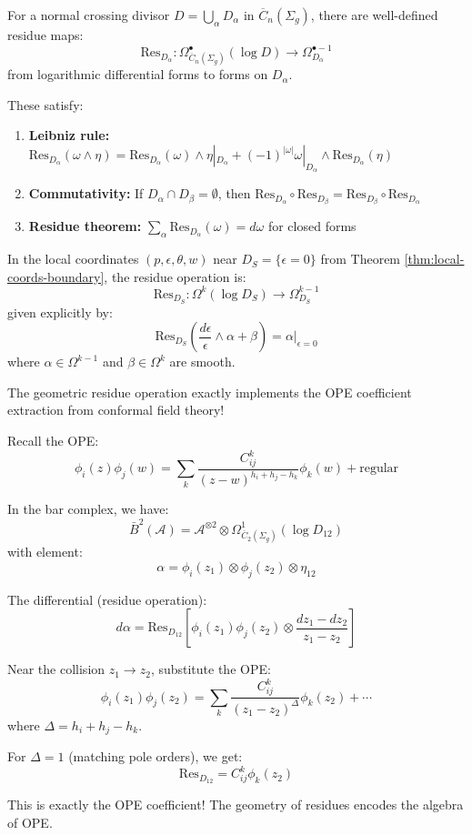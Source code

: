 \begin{theorem}\label{thm:residue-operations}
For a normal crossing divisor $D = \bigcup_\alpha D_\alpha$ in $\overline{C}_n(\Sigma_g)$, there are well-defined residue maps:
$$\text{Res}_{D_\alpha}: \Omega^{\bullet}_{\overline{C}_n(\Sigma_g)}(\log D) \to \Omega^{\bullet-1}_{D_\alpha}$$
from logarithmic differential forms to forms on $D_\alpha$.

These satisfy:
\begin{enumerate}
\item \textbf{Leibniz rule:} $\text{Res}_{D_\alpha}(\omega \wedge \eta) = \text{Res}_{D_\alpha}(\omega) \wedge \eta|_{D_\alpha} + (-1)^{|\omega|}\omega|_{D_\alpha} \wedge \text{Res}_{D_\alpha}(\eta)$
\item \textbf{Commutativity:} If $D_\alpha \cap D_\beta = \emptyset$, then $\text{Res}_{D_\alpha} \circ \text{Res}_{D_\beta} = \text{Res}_{D_\beta} \circ \text{Res}_{D_\alpha}$
\item \textbf{Residue theorem:} $\sum_\alpha \text{Res}_{D_\alpha}(\omega) = d\omega$ for closed forms
\end{enumerate}
\end{theorem}

\begin{proposition}\label{prop:residue-local}
In the local coordinates $(p, \epsilon, \theta, w)$ near $D_S = \{\epsilon = 0\}$ from Theorem \ref{thm:local-coords-boundary}, the residue operation is:
$$\text{Res}_{D_S}: \Omega^k(\log D_S) \to \Omega^{k-1}_{D_S}$$
given explicitly by:
$$\text{Res}_{D_S}\left(\frac{d\epsilon}{\epsilon} \wedge \alpha + \beta\right) = \alpha|_{\epsilon=0}$$
where $\alpha \in \Omega^{k-1}$ and $\beta \in \Omega^k$ are smooth.
\end{proposition}

\begin{remark}\label{rem:residues-and-ope}
The geometric residue operation exactly implements the OPE coefficient extraction from conformal field theory!

Recall the OPE:
$$\phi_i(z)\phi_j(w) = \sum_k \frac{C_{ij}^k}{(z-w)^{h_i+h_j-h_k}} \phi_k(w) + \text{regular}$$

In the bar complex, we have:
$$\bar{B}^2(\mathcal{A}) = \mathcal{A}^{\otimes 2} \otimes \Omega^1_{\overline{C}_2(\Sigma_g)}(\log D_{12})$$
with element:
$$\alpha = \phi_i(z_1) \otimes \phi_j(z_2) \otimes \eta_{12}$$

The differential (residue operation):
$$d\alpha = \text{Res}_{D_{12}}\left[\phi_i(z_1)\phi_j(z_2) \otimes \frac{dz_1 - dz_2}{z_1 - z_2}\right]$$

Near the collision $z_1 \to z_2$, substitute the OPE:
$$\phi_i(z_1)\phi_j(z_2) = \sum_k \frac{C_{ij}^k}{(z_1-z_2)^{\Delta}} \phi_k(z_2) + \cdots$$
where $\Delta = h_i + h_j - h_k$.

For $\Delta = 1$ (matching pole orders), we get:
$$\text{Res}_{D_{12}} = C_{ij}^k \phi_k(z_2)$$

This is exactly the OPE coefficient! The geometry of residues encodes the algebra of OPE.
\end{remark}

